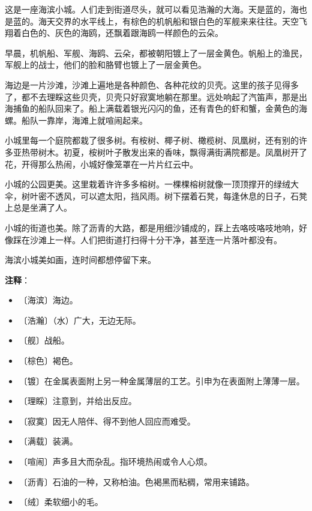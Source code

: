 \documentclass[12pt,UTF-8,openany]{ctexbook}
\begin{document}
\begin{large}
    
    这是一座海滨小城。人们走到街道尽头，就可以看见浩瀚的大海。天是蓝的，海也是蓝的。海天交界的水平线上，有棕色的机帆船和银白色的军舰来来往往。天空飞翔着白色的、灰色的海鸥，还飘着跟海鸥一样颜色的云朵。
    
    早晨，机帆船、军舰、海鸥、云朵，都被朝阳镀上了一层金黄色。帆船上的渔民，军舰上的战士，他们的脸和胳臂也镀上了一层金黄色。
    
    海边是一片沙滩，沙滩上遍地是各种颜色、各种花纹的贝壳。这里的孩子见得多了，都不去理睬这些贝壳，贝壳只好寂寞地躺在那里。远处响起了汽笛声，那是出海捕鱼的船队回来了。船上满载着银光闪闪的鱼，还有青色的虾和蟹，金黄色的海螺。船队一靠岸，海滩上就喧闹起来。
    
    小城里每一个庭院都栽了很多树。有桉树、椰子树、橄榄树、凤凰树，还有别的许多亚热带树木。初夏，桉树叶子散发出来的香味，飘得满街满院都是。凤凰树开了花，开得那么热闹，小城好像笼罩在一片片红云中。
    
    小城的公园更美。这里栽着许许多多榕树。一棵棵榕树就像一顶顶撑开的绿绒大伞，树叶密不透风，可以遮太阳，挡风雨。树下摆着石凳，每逢休息的日子，石凳上总是坐满了人。
    
    小城的街道也美。除了沥青的大路，都是用细沙铺成的，踩上去咯吱咯吱地响，好像踩在沙滩上一样。人们把街道打扫得十分干净，甚至连一片落叶都没有。
    
    海滨小城美如画，连时间都想停留下来。
    
\end{large}


\newpage

\textbf{注释}：

\vspace{-1em}

\begin{itemize}
    \setlength\itemsep{-0.2em}
    \item 〔海滨〕海边。
    \item 〔浩瀚〕（水）广大，无边无际。
    \item 〔舰〕战船。
    \item 〔棕色〕褐色。
    \item 〔镀〕在金属表面附上另一种金属薄层的工艺。引申为在表面附上薄薄一层。
    \item 〔理睬〕注意到，并给出反应。
    \item 〔寂寞〕因无人陪伴、得不到他人回应而难受。
    \item 〔满载〕装满。
    \item 〔喧闹〕声多且大而杂乱。指环境热闹或令人心烦。
    \item 〔沥青〕石油的一种，又称柏油。色褐黑而粘稠，常用来铺路。
    \item 〔绒〕柔软细小的毛。
\end{itemize}
\end{document}
